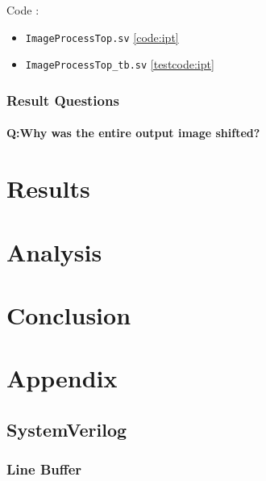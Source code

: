 \documentclass[a4paper]{report}
\begin{document}
			Code : 
			\begin{itemize}
				\item \texttt{ImageProcessTop.sv} \ref{code:ipt}
				\item \texttt{ImageProcessTop\_tb.sv} \ref{testcode:ipt}
			\end{itemize}

			\subsection{Result Questions}

				\subsubsection{Q:Why was the entire output image shifted?}

			


	\chapter{Results}

	\chapter{Analysis}

	\chapter{Conclusion}

	\chapter{Appendix}
		\section{SystemVerilog}

			\subsection{Line Buffer}
	
				

				
\end{document}
